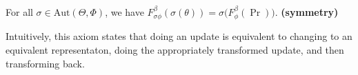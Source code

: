 \documentclass{article}
\begin{document}
\begin{CFaxioms}
    \item
        For all $\sigma
            \in \mathrm{Aut}(\Theta, \Phi)$, we have
        $F^\beta_{\sigma\phi} (\sigma(\theta)) = \sigma \Big( F^\beta_{\phi}(\Pr)\Big)$.
            \hfill \textbf{(symmetry)} \label{ax:symmetry}
        \\
\end{CFaxioms}

Intuitively, this axiom states that doing an update is equivalent to changing to an equivalent representaton, doing the appropriately transformed update, and then transforming back.

\end{document}
